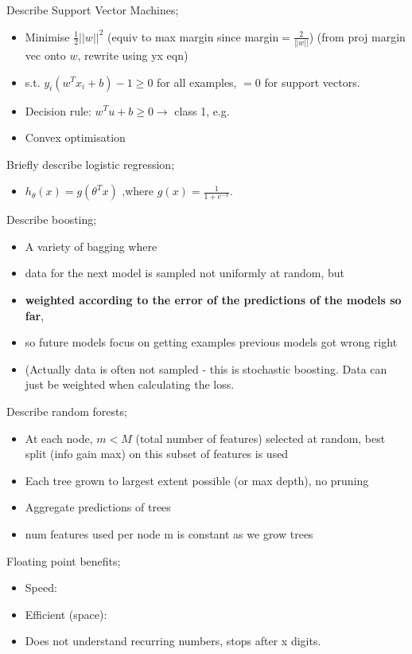 \documentclass{article}
\begin{document}
Describe Support Vector Machines; \begin{itemize} \item Minimise $\frac{1}{2}||w||^2$ (equiv to max margin since margin$=\frac{2}{||w||}$) (from proj margin vec onto $w$, rewrite using yx eqn) \item s.t. $y_i(w^Tx_i+b)-1\geq 0$ for all examples, $=0$ for support vectors.  \item Decision rule: $w^Tu+b\geq 0\rightarrow$ class 1, e.g.  \item Convex optimisation \end{itemize}

Briefly describe logistic regression; \begin{itemize} \item $h_{\theta}(x) = g(\theta^Tx)$ ,where $g(x)=\frac{1}{1+e^{-x}}$.  \end{itemize}

Describe boosting; \begin{itemize} \item A variety of bagging where \item data for the next model is sampled not uniformly at random, but \item \textbf{weighted according to the error of the predictions of the models so far}, \item so future models focus on getting examples previous models got wrong right \item (Actually data is often not sampled - this is stochastic boosting. Data can just be weighted when calculating the loss. \end{itemize}

Describe random forests; \begin{itemize} \item At each node, $m<M$ (total number of features) selected at random, best split (info gain max) on this subset of features is used \item Each tree grown to largest extent possible (or max depth), no pruning \item Aggregate predictions of trees \item num features used per node m is constant as we grow trees \end{itemize}

Floating point benefits; \begin{itemize} \item Speed: \item Efficient (space): \item Does not understand recurring numbers, stops after x digits.  \end{itemize}
\end{document}
